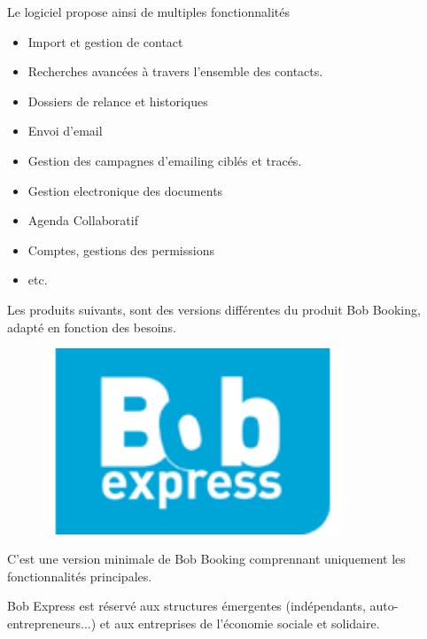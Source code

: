 Le logiciel propose ainsi de multiples fonctionnalités

\begin{itemize}
    \item Import et gestion de contact
    \item Recherches avancées à travers l'ensemble des contacts. 
    \item Dossiers de relance et historiques
    \item Envoi d'email
    \item Gestion des campagnes d'emailing ciblés et tracés.
    \item Gestion electronique des documents
    \item Agenda Collaboratif
    \item Comptes, gestions des permissions
    \item etc.
\end{itemize}

Les produits suivants, sont des versions différentes du produit Bob Booking, adapté en fonction des besoins. 


\begin{minipage}{0.3\textwidth}
	\begin{figure}[H]
		\centering
		\includegraphics[width=0.8\textwidth]{assets/express.png}
    \end{figure}
\end{minipage}%
\begin{minipage}{0.6\textwidth}


C'est une version minimale de Bob Booking comprennant uniquement les fonctionnalités principales. 

Bob Express est réservé aux structures émergentes (indépendants, auto-entrepreneurs...) et aux entreprises de l’économie sociale et solidaire.
\end{minipage}

